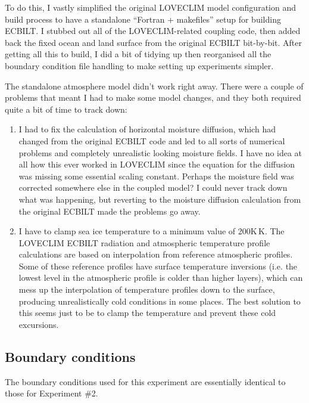 \documentclass[a4paper,11pt]{article}
\begin{document}
To do this, I vastly simplified the original LOVECLIM model
configuration and build process to have a standalone ``Fortran +
makefiles'' setup for building ECBILT.  I stubbed out all of the
LOVECLIM-related coupling code, then added back the fixed ocean and
land surface from the original ECBILT bit-by-bit.  After getting all
this to build, I did a bit of tidying up then reorganised all the
boundary condition file handling to make setting up experiments
simpler.

The standalone atmosphere model didn't work right away.  There were a
couple of problems that meant I had to make some model changes, and
they both required quite a bit of time to track down:

\begin{enumerate}
  \item{I had to fix the calculation of horizontal moisture diffusion,
    which had changed from the original ECBILT code and led to all
    sorts of numerical problems and completely unrealistic looking
    moisture fields.  I have no idea at all how this ever worked in
    LOVECLIM since the equation for the diffusion was missing some
    essential scaling constant.  Perhaps the moisture field was
    corrected somewhere else in the coupled model?  I could never
    track down what was happening, but reverting to the moisture
    diffusion calculation from the original ECBILT made the problems
    go away.}
  \item{I have to clamp sea ice temperature to a minimum value of
    200K\,K.  The LOVECLIM ECBILT radiation and atmospheric
    temperature profile calculations are based on interpolation from
    reference atmospheric profiles.  Some of these reference profiles
    have surface temperature inversions (i.e. the lowest level in the
    atmospheric profile is colder than higher layers), which can mess
    up the interpolation of temperature profiles down to the surface,
    producing unrealistically cold conditions in some places.  The
    best solution to this seems just to be to clamp the temperature
    and prevent these cold excursions.}
\end{enumerate}

\subsection{Boundary conditions}

The boundary conditions used for this experiment are essentially
identical to those for Experiment \#2.
\end{document}
